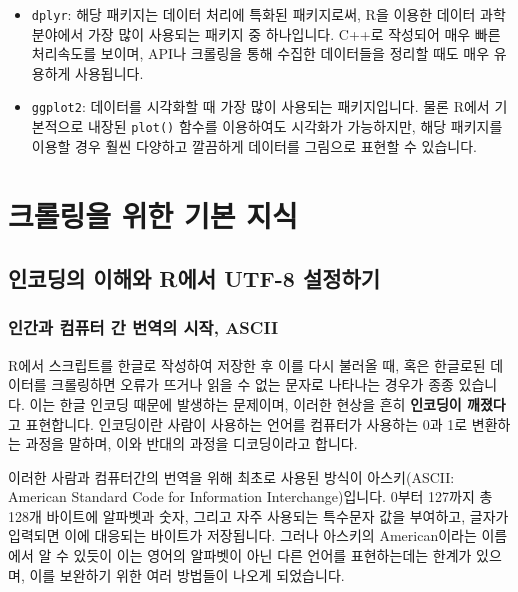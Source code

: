 \documentclass[]{book}
\begin{document}
\begin{itemize}
\item
  \texttt{dplyr}: 해당 패키지는 데이터 처리에 특화된 패키지로써, R을 이용한 데이터 과학 분야에서 가장 많이 사용되는 패키지 중 하나입니다. C++로 작성되어 매우 빠른 처리속도를 보이며, API나 크롤링을 통해 수집한 데이터들을 정리할 때도 매우 유용하게 사용됩니다.
\item
  \texttt{ggplot2}: 데이터를 시각화할 때 가장 많이 사용되는 패키지입니다. 물론 R에서 기본적으로 내장된 \texttt{plot()} 함수를 이용하여도 시각화가 가능하지만, 해당 패키지를 이용할 경우 훨씬 다양하고 깔끔하게 데이터를 그림으로 표현할 수 있습니다.
\end{itemize}

\hypertarget{section-4}{%
\chapter{크롤링을 위한 기본 지식}\label{section-4}}

\hypertarget{r-utf-8-}{%
\section{인코딩의 이해와 R에서 UTF-8 설정하기}\label{r-utf-8-}}

\hypertarget{ascii}{%
\subsection{인간과 컴퓨터 간 번역의 시작, ASCII}\label{ascii}}

R에서 스크립트를 한글로 작성하여 저장한 후 이를 다시 불러올 때, 혹은 한글로된 데이터를 크롤링하면 오류가 뜨거나 읽을 수 없는 문자로 나타나는 경우가 종종 있습니다. 이는 한글 인코딩 때문에 발생하는 문제이며, 이러한 현상을 흔히 \textbf{인코딩이 깨졌다}고 표현합니다. 인코딩이란 사람이 사용하는 언어를 컴퓨터가 사용하는 0과 1로 변환하는 과정을 말하며, 이와 반대의 과정을 디코딩이라고 합니다.

이러한 사람과 컴퓨터간의 번역을 위해 최초로 사용된 방식이 아스키(ASCII: American Standard Code for Information Interchange)입니다. 0부터 127까지 총 128개 바이트에 알파벳과 숫자, 그리고 자주 사용되는 특수문자 값을 부여하고, 글자가 입력되면 이에 대응되는 바이트가 저장됩니다. 그러나 아스키의 American이라는 이름에서 알 수 있듯이 이는 영어의 알파벳이 아닌 다른 언어를 표현하는데는 한계가 있으며, 이를 보완하기 위한 여러 방법들이 나오게 되었습니다.
\end{document}
